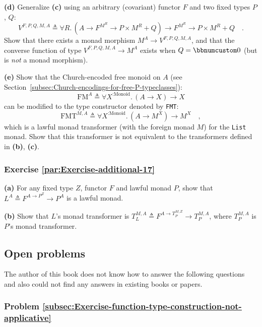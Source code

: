 \textbf{(d)} Generalize \textbf{(c)} using an arbitrary (covariant)
functor $F$ and two fixed types $P$, $Q$:
\[
V^{F,P,Q,M,A}\triangleq\forall R.\,(A\rightarrow F^{M^{R}}\rightarrow P\times M^{R}+Q)\rightarrow F^{M^{R}}\rightarrow P\times M^{R}+Q\quad.
\]
Show that there exists a monad morphism $M^{A}\rightarrow V^{F,P,Q,M,A}$,
and that the converse function of type $V^{F,P,Q,M,A}\rightarrow M^{A}$
exists when $Q=\bbnum 0$ (but is \emph{not} a monad morphism).

\textbf{(e)} Show that the Church-encoded free monoid on $A$ (see
Section~\ref{subsec:Church-encodings-for-free-P-typeclasses}):
\[
\text{FM}^{A}\triangleq\forall X^{:\text{Monoid}}.\,(A\rightarrow X)\rightarrow X
\]
can be modified to the type constructor denoted by \lstinline!FMT!:
\[
\text{FMT}^{M,A}\triangleq\forall X^{:\text{Monoid}}.\,(A\rightarrow M^{X})\rightarrow M^{X}\quad,
\]
which is a lawful monad transformer (with the foreign monad $M$)
for the \lstinline!List! monad. Show that this transformer is not
equivalent to the transformers defined in \textbf{(b)}, \textbf{(c)}. 

\subsubsection{Exercise \label{par:Exercise-additional-17}\ref{par:Exercise-additional-17}}

\textbf{(a)} For any fixed type $Z$, functor $F$ and lawful monad
$P$, show that $L^{A}\triangleq F^{A\rightarrow P^{Z}}\rightarrow P^{A}$
is a lawful monad.

\textbf{(b)} Show that $L$\textsf{'}s monad transformer is $T_{L}^{M,A}\triangleq F^{A\rightarrow T_{P}^{M,Z}}\rightarrow T_{P}^{M,A}$,
where $T_{P}^{M,A}$ is $P$\textsf{'}s monad transformer.

\subsection{Open problems}

The author of this book does not know how to answer the following
questions and also could not find any answers in existing books or
papers.

\subsubsection{Problem \label{subsec:Exercise-function-type-construction-not-applicative}\ref{subsec:Exercise-function-type-construction-not-applicative}}

